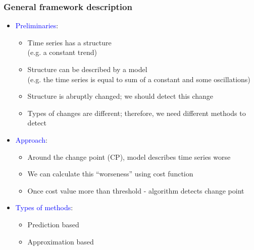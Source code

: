 \documentclass[intlimits, 9pt, unicode]{beamer}
\newcommand{\textblue}[1]{\textcolor{blue}{#1}}
\begin{document}
\begin{frame}
    \frametitle{General framework description}

	    \begin{itemize}
		\item \textblue{Preliminaries}:
		\begin{itemize}
			\item Time series has a structure\\ (e.g. a constant trend)
\vspace{0.1cm}
			\item Structure can be described by a model\\
             (e.g. the time series is equal to sum of a constant and some oscillations)
\vspace{0.1cm}
            \item Structure is abruptly changed; we should detect this change
\vspace{0.1cm}
            \item Types of changes are different; therefore, we need different methods to detect
		\end{itemize}

\vspace{0.2cm}
		\item \textblue{Approach}:
		\begin{itemize}
			\item Around the change point (CP), model describes time series worse
			\item We can calculate this ``worseness'' using cost function
			\item Once cost value more than threshold - algorithm detects change point
		\end{itemize}

\vspace{0.2cm}
		\item \textblue{Types of methods}:
		\begin{itemize}
			\item Prediction based
			\item Approximation based
		\end{itemize}
	    \end{itemize}

\end{frame}
\end{document}
